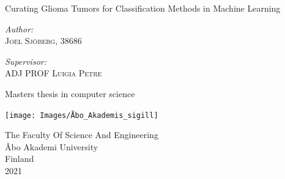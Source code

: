 \documentclass[a4paper, 12pt, oneside]{book}
\begin{document}
\pagestyle{empty}    
\begingroup
{}


\begin{titlepage}
    \begin{center}
        \vspace*{1cm}
            
         
        \vspace{1.5cm}

\vspace{0.4cm}

{\huge Curating Glioma Tumors for Classification Methods in Machine Learning} \\[0.4cm]

\vspace{1.5cm}         
        
\begin{minipage}{0.4\textwidth}
\begin{flushleft} %
\emph{Author:}\\
\textsc{Joel Sjöberg, 38686}
\end{flushleft}
\end{minipage}
\begin{minipage}{0.4\textwidth}
\begin{flushright} %
\emph{Supervisor:} \\
\textsc{ADJ PROF Luigia Petre}
\end{flushright}
\end{minipage}        
        
        
        \Huge
        \vfill
        
        Masters thesis in computer science
            
        \vspace{0.8cm}
            
        \texttt{[image: Images/Åbo\_Akademis\_sigill]}
            
        \Large
        The Faculty Of Science And Engineering\\
        Åbo Akademi University\\
        Finland\\
        2021
            
    \end{center}
\end{titlepage}
\end{document}

